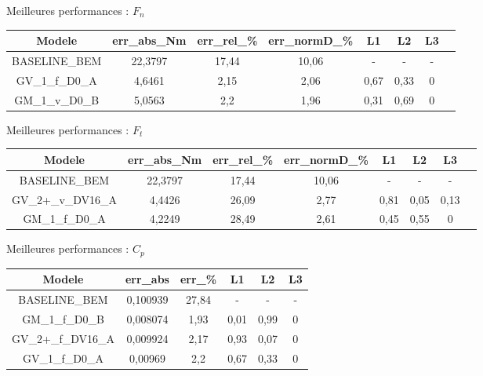 \documentclass[
11pt,notheorems,hyperref={pdfauthor=whatever}
]{beamer}
\begin{document}
\begin{frame}{Meilleures performances : $F_n$}
    \centering
    \begin{tabular}{|c|c|c|c|c|c|c|c|}
    \hline
    Modele & err\_abs\_Nm & err\_rel\_\% & err\_normD\_\% & L1 & L2 & L3 \\
    \hline
    BASELINE\_BEM & 22,3797 & 17,44 & 10,06 & - & - & - \\
    GV\_1\_f\_D0\_A & 4,6461 & 2,15 & 2,06 & 0,67 & 0,33 & 0 \\
    GM\_1\_v\_D0\_B & 5,0563 & 2,2 & 1,96 & 0,31 & 0,69 & 0 \\
    \hline
  \end{tabular}
\end{frame}

\begin{frame}{Meilleures performances : $F_t$}
    \centering
    \begin{tabular}{|c|c|c|c|c|c|c|c|}
        \hline
        Modele & err\_abs\_Nm & err\_rel\_\% & err\_normD\_\% & L1 & L2 & L3 \\
        \hline
        BASELINE\_BEM & 22,3797 & 17,44 & 10,06 & - & - & - \\    
        GV\_2+\_v\_DV16\_A & 4,4426 & 26,09 & 2,77 & 0,81 & 0,05 & 0,13 \\
        GM\_1\_f\_D0\_A & 4,2249 & 28,49 & 2,61 & 0,45 & 0,55 & 0 \\
        \hline
    \end{tabular}
\end{frame}

\begin{frame}{Meilleures performances : $C_p$}

    \centering
    \begin{tabular}{|c|c|c|c|c|c|}
        \hline
        Modele & err\_abs & err\_\% & L1 & L2 & L3 \\
        \hline
        BASELINE\_BEM & 0,100939 & 27,84 & - & - & - \\
        \hline
        GM\_1\_f\_D0\_B & 0,008074 & 1,93 & 0,01 & 0,99 & 0 \\
        GV\_2+\_f\_DV16\_A & 0,009924 & 2,17 & 0,93 & 0,07 & 0 \\
        GV\_1\_f\_D0\_A & 0,00969 & 2,2 & 0,67 & 0,33 & 0 \\
        \hline

    \end{tabular}

\end{frame}
\end{document}
